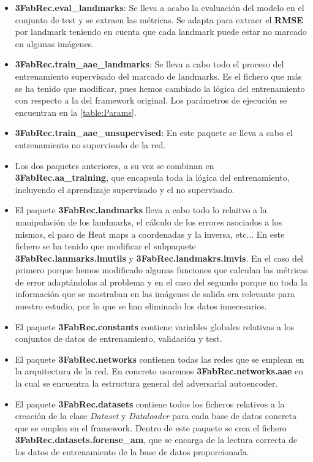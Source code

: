 \begin{itemize}
    \item \textcolor{mygreen}{\textbf{3FabRec.eval\_landmarks}}: Se lleva a acabo la evaluación del modelo en el conjunto de test y se extraen las métricas. Se adapta para extraer el \textbf{RMSE} por landmark teniendo en cuenta que cada landmark puede estar no marcado en algunas imágenes.
    \item \textcolor{mygreen}{\textbf{3FabRec.train\_aae\_landmarks}}: Se lleva a cabo todo el proceso del entrenamiento supervisado del marcado de landmarks. Es el fichero que más se ha tenido que modificar, pues hemos cambiado la lógica del entrenamiento con respecto a la del framework original. Los parámetros de ejecución se encuentran en la \autoref{table:Params}.
    \item \textbf{3FabRec.train\_aae\_unsupervised}: En este paquete se lleva a cabo el entrenamiento no supervisado de la red.
    \item Los dos paquetes anteriores, a su vez se combinan en \textbf{3FabRec.aa\_training}, que encapsula toda la lógica del entrenamiento, incluyendo el aprendizaje supervisado y el no supervisado.
    \item El paquete \textbf{3FabRec.landmarks} lleva a cabo todo lo relaitvo a la manipulación de los landmarks, el cálculo de los errores asociados a los mismos, el paso de Heat maps a coordenadas y la inversa, etc... En este fichero se ha tenido que modificar el subpaquete \textcolor{mygreen}{\textbf{3FabRec.lanmarks.lmutils}} y \textcolor{mygreen}{\textbf{3FabRec.landmakrs.lmvis}}. En el caso del primero porque hemos modificado algunas funciones que calculan las métricas de error adaptándolas al problema y en el caso del segundo porque no toda la información que se mostraban en las imágenes de salida era relevante para nuestro estudio, por lo que se han eliminado los datos innecesarios.
    \item El paquete \textbf{3FabRec.constants} contiene variables globales relativas a los conjuntos de datos de entrenamiento, validación y test.
    \item El paquete \textbf{3FabRec.networks} contienen todas las redes que se emplean en la arquitectura de la red. En concreto usaremos \textbf{3FabRec.networks.aae} en la cual se encuentra la estructura general del adversarial autoencoder.
    \item El paquete \textbf{3FabRec.datasets} contiene todos los ficheros relativos a la creación de la clase \textit{Dataset} y \textit{Dataloader} para cada base de datos concreta que se emplea en el framework. Dentro de este paquete se crea el fichero \textcolor{mygreen}{\textbf{3FabRec.datasets.forense\_am}}, que se encarga de la lectura correcta de los datos de entrenamiento de la base de datos proporcionada.
\end{itemize}

